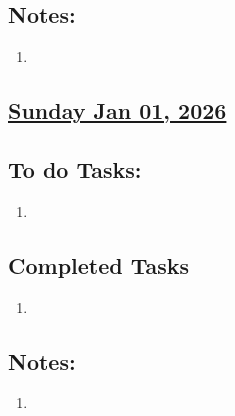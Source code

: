 \subsection*{Notes:}
\begin{enumerate}
    \item 
\end{enumerate}
\subsection*{\underline{Sunday Jan 01, 2026}}
\subsection*{To do Tasks:}
\begin{enumerate}
    \item
\end{enumerate}
\subsection*{Completed Tasks}
\begin{enumerate}[\ding{52}]  %
    \item 
\end{enumerate}
\subsection*{Notes:}
\begin{enumerate}
    \item 
\end{enumerate}